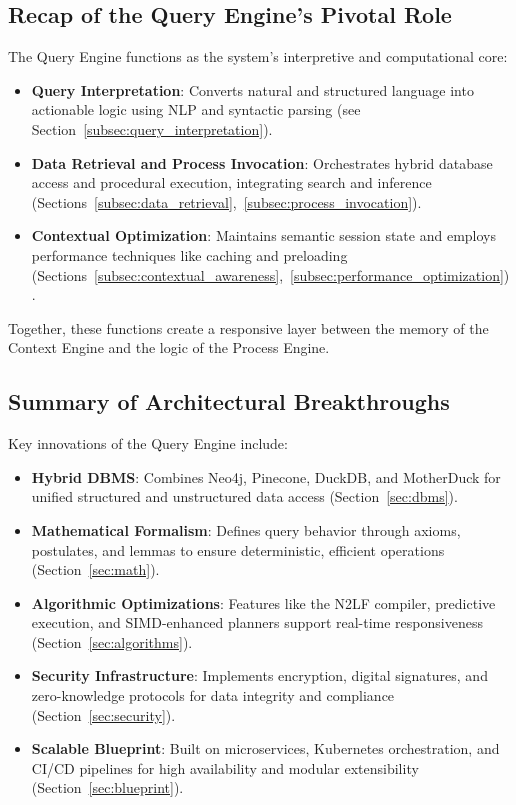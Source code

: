 \documentclass[11pt]{article}
\begin{document}
\subsection{Recap of the Query Engine’s Pivotal Role}

The Query Engine functions as the system’s interpretive and computational core:

\begin{itemize}
    \item \textbf{Query Interpretation}: Converts natural and structured language into actionable logic using NLP and syntactic parsing (see Section~\ref{subsec:query_interpretation}).
    \item \textbf{Data Retrieval and Process Invocation}: Orchestrates hybrid database access and procedural execution, integrating search and inference (Sections~\ref{subsec:data_retrieval},~\ref{subsec:process_invocation}).
    \item \textbf{Contextual Optimization}: Maintains semantic session state and employs performance techniques like caching and preloading (Sections~\ref{subsec:contextual_awareness},~\ref{subsec:performance_optimization}).
\end{itemize}

Together, these functions create a responsive layer between the memory of the Context Engine and the logic of the Process Engine.

\subsection{Summary of Architectural Breakthroughs}

Key innovations of the Query Engine include:

\begin{itemize}
    \item \textbf{Hybrid DBMS}: Combines Neo4j, Pinecone, DuckDB, and MotherDuck for unified structured and unstructured data access (Section~\ref{sec:dbms}).
    \item \textbf{Mathematical Formalism}: Defines query behavior through axioms, postulates, and lemmas to ensure deterministic, efficient operations (Section~\ref{sec:math}).
    \item \textbf{Algorithmic Optimizations}: Features like the N2LF compiler, predictive execution, and SIMD-enhanced planners support real-time responsiveness (Section~\ref{sec:algorithms}).
    \item \textbf{Security Infrastructure}: Implements encryption, digital signatures, and zero-knowledge protocols for data integrity and compliance (Section~\ref{sec:security}).
    \item \textbf{Scalable Blueprint}: Built on microservices, Kubernetes orchestration, and CI/CD pipelines for high availability and modular extensibility (Section~\ref{sec:blueprint}).
\end{itemize}
\end{document}
